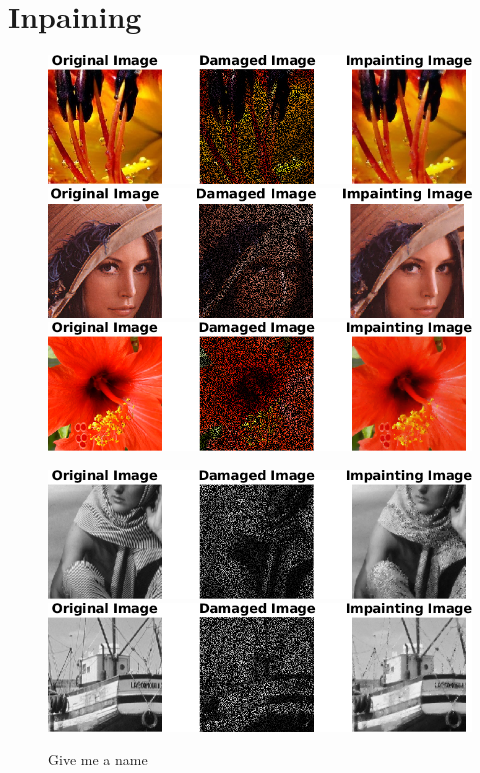 \documentclass[a4paper,12pt]{article}
\begin{document}
\section{Inpaining}
\begin{figure}[t]
        \centering
        \includegraphics{../Results/Inpainting_pdual_flowers_evolution.png}
        \includegraphics{../Results/Inpainting_pdual_lena_evolution.png}
        \includegraphics{../Results/Inpainting_pdual_hibiscus_evolution.png}
		\label{fig:evolve1}
\end{figure}

\begin{figure}[t]
        \centering
        \includegraphics{../Results/Inpainting_pdual_barb_evolution.png}
        \includegraphics{../Results/Inpainting_pdual_boat_evolution.png}
        \caption{Give me a name} 
		\label{fig:evolve2}
\end{figure}
\end{document}
